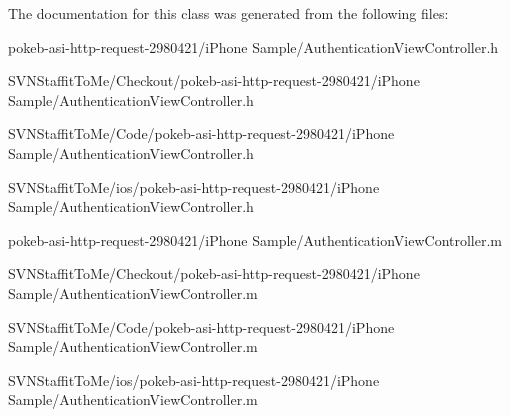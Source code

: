\-The documentation for this class was generated from the following files\-:\begin{DoxyCompactItemize}
\item 
pokeb-\/asi-\/http-\/request-\/2980421/i\-Phone Sample/\-Authentication\-View\-Controller.\-h\item 
\-S\-V\-N\-Staffit\-To\-Me/\-Checkout/pokeb-\/asi-\/http-\/request-\/2980421/i\-Phone Sample/\-Authentication\-View\-Controller.\-h\item 
\-S\-V\-N\-Staffit\-To\-Me/\-Code/pokeb-\/asi-\/http-\/request-\/2980421/i\-Phone Sample/\-Authentication\-View\-Controller.\-h\item 
\-S\-V\-N\-Staffit\-To\-Me/ios/pokeb-\/asi-\/http-\/request-\/2980421/i\-Phone Sample/\-Authentication\-View\-Controller.\-h\item 
pokeb-\/asi-\/http-\/request-\/2980421/i\-Phone Sample/\-Authentication\-View\-Controller.\-m\item 
\-S\-V\-N\-Staffit\-To\-Me/\-Checkout/pokeb-\/asi-\/http-\/request-\/2980421/i\-Phone Sample/\-Authentication\-View\-Controller.\-m\item 
\-S\-V\-N\-Staffit\-To\-Me/\-Code/pokeb-\/asi-\/http-\/request-\/2980421/i\-Phone Sample/\-Authentication\-View\-Controller.\-m\item 
\-S\-V\-N\-Staffit\-To\-Me/ios/pokeb-\/asi-\/http-\/request-\/2980421/i\-Phone Sample/\-Authentication\-View\-Controller.\-m\end{DoxyCompactItemize}
